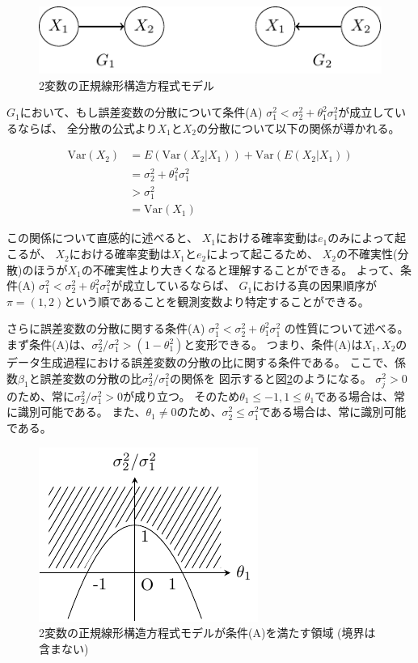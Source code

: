 \begin{figure}[h]
  \centering
  \includegraphics{./picture/bivariate_SEM.pdf}
  \caption{2変数の正規線形構造方程式モデル}
  \label{fig:ex_bivariate_SEM}
\end{figure}

$G_1$において、もし誤差変数の分散について条件(A)
$\sigma_1^2 < \sigma_2^2 + \theta_1^2 \sigma_1^2$が成立しているならば、
全分散の公式より$X_1$と$X_2$の分散について以下の関係が導かれる。

\begin{align*}
  \mathrm{Var}(X_2) &= E(\mathrm{Var}(X_2|X_1)) + \mathrm{Var}(E(X_2|X_1)) \\
                    &= \sigma_2^2 + \theta_1^2 \sigma_1^2 \\
                    &> \sigma_1^2 \\
                    &= \mathrm{Var}(X_1)
\end{align*}

この関係について直感的に述べると、
$X_1$における確率変動は$e_1$のみによって起こるが、
$X_2$における確率変動は$X_1$と$e_2$によって起こるため、
$X_2$の不確実性(分散)のほうが$X_1$の不確実性より大きくなると理解することができる。
よって、条件(A) $\sigma_1^2 < \sigma_2^2 + \theta_1^2 \sigma_1^2$が成立しているならば、
$G_1$における真の因果順序が$\pi = (1,2)$という順であることを観測変数より特定することができる。

さらに誤差変数の分散に関する条件(A) $\sigma_1^2 < \sigma_2^2 + \theta_1^2 \sigma_1^2$
の性質について述べる。
まず条件(A)は、$\sigma_2^2 / \sigma_1^2 > (1-\theta_1^2)$と変形できる。
つまり、条件(A)は$X_1, X_2$のデータ生成過程における誤差変数の分散の比に関する条件である。
ここで、係数$\beta_1$と誤差変数の分散の比$\sigma_2^2/ \sigma_1^2$の関係を
図示すると図\ref{fig:error_ratio}のようになる。
$\sigma_j^2 > 0$のため、常に$\sigma_2^2/ \sigma_1^2 > 0$が成り立つ。
そのため$\theta_1 \leq -1, 1 \leq \theta_1$である場合は、常に識別可能である。
また、$\theta_1 \neq 0$のため、$\sigma_2^2 \leq \sigma_1^2$である場合は、常に識別可能である。

\begin{figure}[htb]
  \centering
  \includegraphics{./picture/error_ratio.pdf}
  \caption{2変数の正規線形構造方程式モデルが条件(A)を満たす領域 (境界は含まない)}
  \label{fig:error_ratio}
\end{figure}
